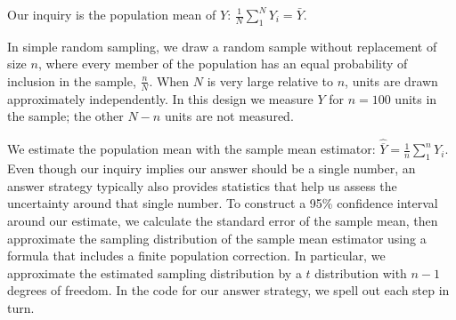 \documentclass[11pt]{article}\usepackage[]{graphicx}\usepackage[]{color}
\newcommand\I{\bigskip\marginnote{\LARGE \sc I \hspace{.02em}}\noindent}
\newcommand\D{\bigskip\marginnote{\LARGE \sc D}\noindent}
\newcommand\A{\bigskip\marginnote{\LARGE \sc A}\noindent}
\begin{document}
\I Our inquiry is the population mean of $Y$: $\frac{1}{N} \sum_1^N Y_i = \bar{Y}$.

\D In simple random sampling, we draw a random sample without replacement of size $n$, where every member of the population has an equal probability of inclusion in the sample, $\frac{n}{N}$. When $N$ is very large relative to $n$, units are drawn approximately independently. In this design we measure $Y$ for $n=100$ units in the sample; the other $N-n$ units are not measured.

\A  We estimate the population mean with the sample mean estimator: $\widehat{\overline{Y}} = \frac{1}{n} \sum_1^n Y_i$. Even though our inquiry implies our answer should be a single number, an answer strategy typically also provides statistics that help us assess the uncertainty around that single number. To construct a 95\% confidence interval around our estimate, we calculate the standard error of the sample mean, then approximate the sampling distribution of the sample mean estimator using a formula that includes a finite population correction. In particular, we approximate the estimated sampling distribution by a $t$ distribution with $n - 1$ degrees of freedom. In the code for our answer strategy, we spell out each step in turn. 
\end{document}
